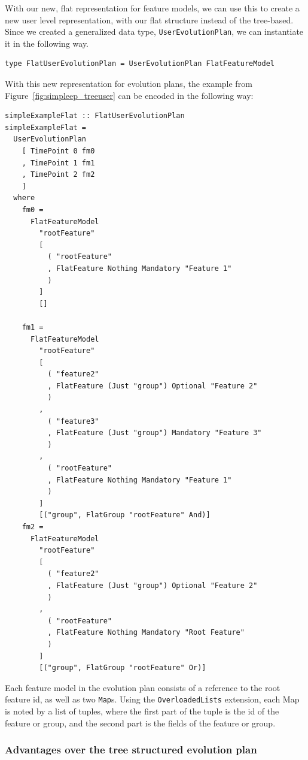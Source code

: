 \documentclass[a4paper,english]{ifimaster}
\begin{document}
With our new, flat representation for feature models, we can use this to create a new user level representation, with our flat structure instead of the tree-based. Since we created a generalized data type, \texttt{UserEvolutionPlan}, we can instantiate it in the following way.

\begin{verbatim}
type FlatUserEvolutionPlan = UserEvolutionPlan FlatFeatureModel
\end{verbatim}

With this new representation for evolution plans, the example from Figure~\vref{fig:simpleep_treeuser} can be encoded in the following way:

\begin{verbatim}
simpleExampleFlat :: FlatUserEvolutionPlan
simpleExampleFlat =
  UserEvolutionPlan
    [ TimePoint 0 fm0
    , TimePoint 1 fm1
    , TimePoint 2 fm2
    ]
  where
    fm0 =
      FlatFeatureModel
        "rootFeature"
        [
          ( "rootFeature"
          , FlatFeature Nothing Mandatory "Feature 1"
          )
        ]
        []

    fm1 =
      FlatFeatureModel
        "rootFeature"
        [
          ( "feature2"
          , FlatFeature (Just "group") Optional "Feature 2"
          )
        ,
          ( "feature3"
          , FlatFeature (Just "group") Mandatory "Feature 3"
          )
        ,
          ( "rootFeature"
          , FlatFeature Nothing Mandatory "Feature 1"
          )
        ]
        [("group", FlatGroup "rootFeature" And)]
    fm2 =
      FlatFeatureModel
        "rootFeature"
        [
          ( "feature2"
          , FlatFeature (Just "group") Optional "Feature 2"
          )
        ,
          ( "rootFeature"
          , FlatFeature Nothing Mandatory "Root Feature"
          )
        ]
        [("group", FlatGroup "rootFeature" Or)]
\end{verbatim}

Each feature model in the evolution plan consists of a reference to the root feature id, as well as two \texttt{Map}s. Using the \texttt{OverloadedLists} extension, each Map is noted by a list of tuples, where the first part of the tuple is the id of the feature or group, and the second part is the fields of the feature or group.

\subsubsection*{Advantages over the tree structured evolution plan}%
\label{ssub:advantages_over_the_tree_structured_evolution_plan}
\end{document}

